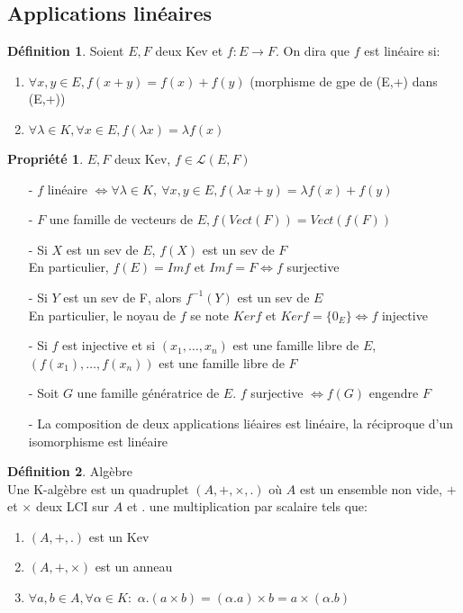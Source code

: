 \documentclass[fleqn]{article}
\theoremstyle{definition} \newtheorem*{defi}{D\'efinition}
\theoremstyle{definition} \newtheorem*{theo}{Th\'eor\`eme}
\theoremstyle{definition} \newtheorem*{coro}{Corollaire}
\theoremstyle{definition} \newtheorem*{nota}{Notation}
\theoremstyle{remark} \newtheorem*{rqs}{Remarques}
\theoremstyle{definition} \newtheorem*{prop}{Propri\'et\'e}
\begin{document}
\subsection{Applications lin\'eaires}
\begin{defi} Soient $E,F$ deux Kev et $f: E \rightarrow F$. On dira que $f$ est lin\'eaire si:
	\begin{enumerate}
		\item $\forall x,y \in E, f(x+y) = f(x) + f(y)$ (morphisme de gpe de (E,+) dans (E,+))
		\item $\forall \lambda \in K, \forall x \in E, f(\lambda x) = \lambda f(x)$
	\end{enumerate}
\end{defi}

\begin{prop} $E,F$ deux Kev, $f \in \mathscr{L}(E,F)$
	\begin{itemize}
		\item [-] $f$ lin\'eaire $\Leftrightarrow \forall \lambda \in K,\ \forall x,y \in E, f(\lambda x + y) = \lambda f(x) + f(y)$
		\item [-] $F$ une famille de vecteurs de $E, f(Vect(F)) = Vect(f(F))$
		\item [-] Si $X$ est un sev de $E$, $f(X)$ est un sev de $F$ \\
			En particulier, $f(E) = Im f$ et $Im f = F \Leftrightarrow f$ surjective
		\item [-] Si $Y$ est un sev de F, alors $f^{-1}(Y)$ est un sev de $E$\\
			En particulier, le noyau de $f$ se note $Ker f$ et $Ker f = \{0_E\} \Leftrightarrow f$ injective
		\item [-] Si $f$ est injective et si $(x_1, \hdots, x_n)$ est une famille libre de $E$, $(f(x_1), \hdots, f(x_n))$ est une famille libre
			de $F$
		\item [-] Soit $G$ une famille g\'en\'eratrice de $E$. $f$ surjective $\Leftrightarrow f(G)$ engendre $F$
		\item [-] La composition de deux applications li\'eaires est lin\'eaire, la r\'eciproque d'un isomorphisme est lin\'eaire
	\end{itemize}
\end{prop}

\begin{defi} Alg\`ebre\\
	Une K-alg\`ebre est un quadruplet $(A,+,\times, .)$ o\`u $A$ est un ensemble non vide, $+$ et $\times$ deux LCI sur $A$ et $.$ une
	multiplication par scalaire tels que:
	\begin{enumerate}
		\item $(A, + , .)$ est un Kev
		\item $(A, +, \times)$ est un anneau
		\item $\forall a, b \in A, \forall \alpha \in K:$ $\alpha . (a\times b) = (\alpha . a) \times b = a \times (\alpha . b)$
	\end{enumerate}
\end{defi}
\end{document}
